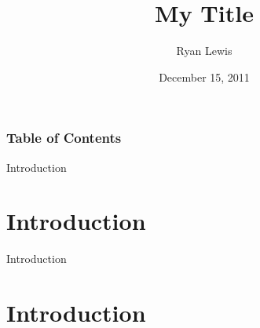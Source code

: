 \documentclass{beamer}
\title[Hello World]{My Title}
\author{Ryan Lewis}
\institute{Clarkson University}
\date{December 15, 2011}
\begin{document}
\begin{frame}
\titlepage
\end{frame}

\begin{frame}
	\frametitle{Table of Contents}
	\tableofcontents
\end{frame}


\begin{frame}{Introduction}
	\section{Introduction}
	
\end{frame}

\begin{frame}{Introduction}
	\section{Introduction}
	
\end{frame}
\end{document}

